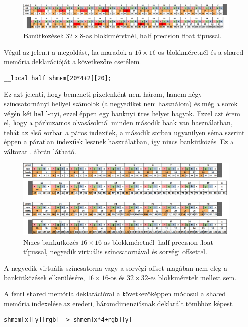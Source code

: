 		\begin{figure}[h]
			\centering
			\includegraphics[width=\textwidth]{kep/gpu_bank_collision_f16_32.png}
			\caption{Banütközések $32\times8$-as blokkméretnél, half precision float típussal.}
			\label{fig:gpu_bank_collision_f16_32}
		\end{figure}
		Végül az jelenti a megoldást, ha maradok a $16\times16$-os blokkméretnél és a shared memória deklarációját a következőre cserélem.
		\begin{lstlisting}
__local half shmem[20*4+2][20];\end{lstlisting}
		Ez azt jelenti, hogy bemeneti pixelenként nem három, hanem négy színcsatornányi hellyel számolok (a negyediket nem használom) és még a sorok végén két \verb|half|-nyi, ezzel éppen egy banknyi üres helyet hagyok. Ezzel azt érem el, hogy a párhuzamos olvasásoknál minden második bank van használatban, tehát az első sorban a páros indexűek, a második sorban ugyanilyen séma szerint éppen a páratlan indexűek lesznek használatban, így nincs bankütközés. Ez a változat . ábrán látható.
		
		\begin{figure}[h]
			\centering
			\includegraphics[width=\textwidth]{kep/gpu_bank_collision_f16_16_rgbx_padded.png}
			\caption{Nincs bankütközés $16\times16$-as blokkméretnél, half precision float típussal, negyedik virtuális színcsatornával és sorvégi offsettel.}
			\label{fig:gpu_bank_collision_f16_16_rgbx_padded}
		\end{figure}
		A negyedik virtuális színcsatorna vagy a sorvégi offset magában nem elég a bankütközések elkerülésére, $16\times16$-os és $32\times32$-es blokkméretek mellett sem.
		
		A fenti shared memória deklarációval a következőképpen módosul a shared memória indexelése az eredeti, háromdimenziósnak deklarált tömbhöz képest.
		\begin{lstlisting}
shmem[x][y][rgb] -> shmem[x*4+rgb][y]\end{lstlisting}

